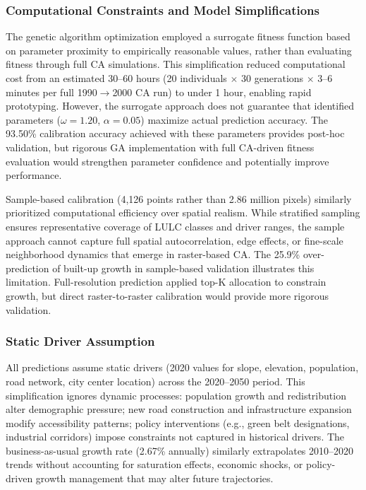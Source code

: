 \documentclass[12pt,a4paper]{article}
\begin{document}
\subsubsection{Computational Constraints and Model Simplifications}

The genetic algorithm optimization employed a surrogate fitness function based on parameter proximity to empirically reasonable values, rather than evaluating fitness through full CA simulations. This simplification reduced computational cost from an estimated 30--60 hours (20 individuals $\times$ 30 generations $\times$ 3--6 minutes per full 1990$\rightarrow$2000 CA run) to under 1 hour, enabling rapid prototyping. However, the surrogate approach does not guarantee that identified parameters ($\omega=1.20$, $\alpha=0.05$) maximize actual prediction accuracy. The 93.50\% calibration accuracy achieved with these parameters provides post-hoc validation, but rigorous GA implementation with full CA-driven fitness evaluation would strengthen parameter confidence and potentially improve performance.

Sample-based calibration (4,126 points rather than 2.86 million pixels) similarly prioritized computational efficiency over spatial realism. While stratified sampling ensures representative coverage of LULC classes and driver ranges, the sample approach cannot capture full spatial autocorrelation, edge effects, or fine-scale neighborhood dynamics that emerge in raster-based CA. The 25.9\% over-prediction of built-up growth in sample-based validation illustrates this limitation. Full-resolution prediction applied top-K allocation to constrain growth, but direct raster-to-raster calibration would provide more rigorous validation.

\subsubsection{Static Driver Assumption}

All predictions assume static drivers (2020 values for slope, elevation, population, road network, city center location) across the 2020--2050 period. This simplification ignores dynamic processes: population growth and redistribution alter demographic pressure; new road construction and infrastructure expansion modify accessibility patterns; policy interventions (e.g., green belt designations, industrial corridors) impose constraints not captured in historical drivers. The business-as-usual growth rate (2.67\% annually) similarly extrapolates 2010--2020 trends without accounting for saturation effects, economic shocks, or policy-driven growth management that may alter future trajectories.
\end{document}
